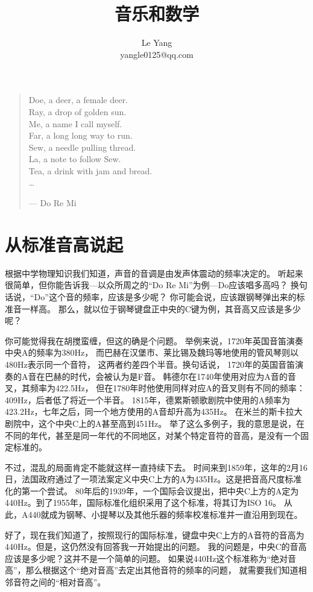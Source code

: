 \documentclass[a4paper,hyperref, UTF8]{ctexart}
\begin{document}
\title{音乐和数学}
\author{
Le Yang\\
yangle0125@qq.com
}
\date{}
\maketitle


\begin{quote}
\begin{flushright}
Doe, a deer, a female deer.\\
Ray, a drop of golden sun.\\
Me, a name I call myself.\\
Far, a long long way to run.\\
Sew, a needle pulling thread.\\
La, a note to follow Sew.\\
Tea, a drink with jam and bread.\\
\dots

--- Do Re Mi
\end{flushright}
\end{quote}

\section{从标准音高说起}
根据中学物理知识我们知道，声音的音调是由发声体震动的频率决定的。
听起来很简单，但你能告诉我---以众所周之的“Do Re Mi”为例---Do应该唱多高吗？
换句话说，“Do”这个音的频率，应该是多少呢？
你可能会说，应该跟钢琴弹出来的标准音一样高。
那么，就以位于钢琴键盘正中央的C键为例，其音高又应该是多少呢？

你可能觉得我在胡搅蛮缠，但这的确是个问题。
举例来说，1720年英国音笛演奏中央A的频率为380Hz，
而巴赫在汉堡市、莱比锡及魏玛等地使用的管风琴则以480Hz表示同一个音符，
这两者约差四个半音。换句话说，
1720年的英国音笛演奏的A音在巴赫的时代，会被认为是F音。
韩德尔在1740年使用对应为A音的音叉，其频率为422.5Hz，
但在1780年时他使用同样对应A的音叉则有不同的频率：409Hz，后者低了将近一个半音。
1815年，德累斯顿歌剧院中使用的A频率为423.2Hz，七年之后，同一个地方使用的A音却升高为435Hz。
在米兰的斯卡拉大剧院中，这个中央C上的A甚至高到451Hz。
举了这么多例子，我的意思是说，在不同的年代，甚至是同一年代的不同地区，对某个特定音符的音高，是没有一个固定标准的。

不过，混乱的局面肯定不能就这样一直持续下去。
时间来到1859年，这年的2月16日，法国政府通过了一项法案定义中央C上方的A为435Hz。这是把音高尺度标准化的第一个尝试。
80年后的1939年，一个国际会议提出，把中央C上方的A定为440Hz。到了1955年，国际标准化组织采用了这个标准，将其订为ISO 16。
从此，A440就成为钢琴、小提琴以及其他乐器的频率校准标准并一直沿用到现在。

好了，现在我们知道了，按照现行的国际标准，键盘中央C上方的A音符的音高为440Hz。但是，这仍然没有回答我一开始提出的问题。
我的问题是，中央C的音高应该是多少呢？这并不是一个简单的问题。
如果说440Hz这个标准称为“绝对音高”，那么根据这个“绝对音高”去定出其他音符的频率的问题，
就需要我们知道相邻音符之间的“相对音高”。
\end{document}
